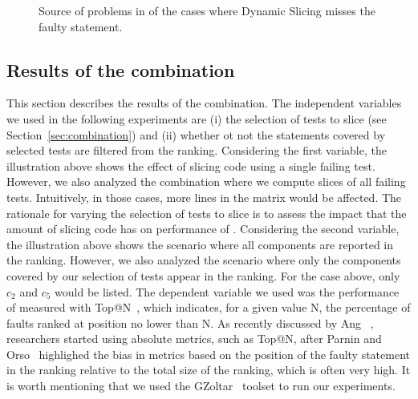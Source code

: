 \documentclass[sigplan,10pt,review,anonymous]{acmart}\settopmatter{printfolios=true,printccs=false,printacmref=false}
\begin{document}
\begin{figure}[ht]
  \centering
  \caption{\label{pie-chart}Source of problems in  of the
     cases where Dynamic Slicing misses the faulty statement.}
\end{figure}


\subsection{Results of the \comb{} combination}

This section describes the results of the \comb{} combination. The
independent variables we used in the following experiments are (i) the
selection of tests to slice (see Section~\ref{sec:combination}) and
(ii) whether ot not the statements covered by selected tests are
filtered from the ranking.  Considering the first variable, the
illustration above shows the effect of slicing code using a single
failing test. However, we also analyzed the combination where we
compute slices of all failing tests. Intuitively, in those cases, more
lines in the matrix would be affected. The rationale for varying the
selection of tests to slice is to assess the impact that the amount of
slicing code has on performance of \sfl{}.  Considering the second
variable, the illustration above shows the scenario where all
components are reported in the ranking. However, we also analyzed the
scenario where only the components covered by our selection of tests
appear in the ranking. For the case above, only $c_2$ and $c_5$ would
be listed.  The dependent variable we used was the performance of
\sfl{} measured with
Top@N~\cite{Wu:2014:CLC:2610384.2610386,Lucia:2014:FFL:2642937.2642983,Wen:2016:LLB:2970276.2970359},
which indicates, for a given value N, the percentage of faults ranked
at position no lower than N. As recently discussed by Ang
\etal~\cite{ang-perez-van-deursen-rui-2017}, \sfl{} researchers
started using absolute metrics, such as Top@N, after Parnin and
Orso~\cite{parnin-orso-2011} highlighed the bias in metrics based on
the position of the faulty statement in the ranking relative to the
total size of the ranking, which is often very high. It is worth
mentioning that we used the GZoltar~\cite{gzoltar} toolset to run our
experiments.
\end{document}
